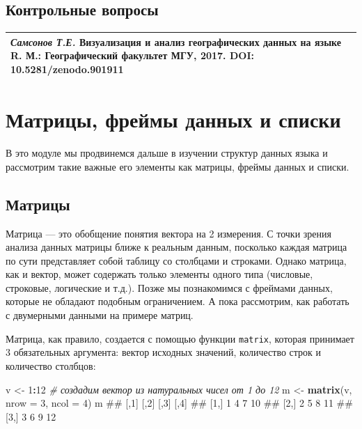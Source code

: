 \documentclass[]{book}
\newenvironment{Shaded}{\begin{snugshade}}{\end{snugshade}}
\newcommand{\KeywordTok}[1]{\textcolor[rgb]{0.13,0.29,0.53}{\textbf{#1}}}
\newcommand{\DataTypeTok}[1]{\textcolor[rgb]{0.13,0.29,0.53}{#1}}
\newcommand{\DecValTok}[1]{\textcolor[rgb]{0.00,0.00,0.81}{#1}}
\newcommand{\StringTok}[1]{\textcolor[rgb]{0.31,0.60,0.02}{#1}}
\newcommand{\CommentTok}[1]{\textcolor[rgb]{0.56,0.35,0.01}{\textit{#1}}}
\newcommand{\OperatorTok}[1]{\textcolor[rgb]{0.81,0.36,0.00}{\textbf{#1}}}
\newcommand{\NormalTok}[1]{#1}
\begin{document}
\section{Контрольные вопросы}\label{questions_vectors}

\begin{longtable}[]{@{}l@{}}
\toprule
\emph{Самсонов Т.Е.} \textbf{Визуализация и анализ географических данных
на языке R.} М.: Географический факультет МГУ, 2017. DOI:
10.5281/zenodo.901911\tabularnewline
\bottomrule
\end{longtable}

\chapter{Матрицы, фреймы данных и списки}\label{matrix_dataframes}

В это модуле мы продвинемся дальше в изучении структур данных языка и
рассмотрим такие важные его элементы как матрицы, фреймы данных и
списки.

\section{Матрицы}\label{matrices}

Матрица --- это обобщение понятия вектора на 2 измерения. С точки зрения
анализа данных матрицы ближе к реальным данным, посколько каждая матрица
по сути представляет собой таблицу со столбцами и строками. Однако
матрица, как и вектор, может содержать только элементы одного типа
(числовые, строковые, логические и т.д.). Позже мы познакомимся с
фреймами данных, которые не обладают подобным ограничением. А пока
рассмотрим, как работать с двумерными данными на примере матриц.

Матрица, как правило, создается с помощью функции \texttt{matrix},
которая принимает 3 обязательных аргумента: вектор исходных значений,
количество строк и количество столбцов:

\begin{Shaded}
\begin{Highlighting}[]
\NormalTok{v <-}\StringTok{ }\DecValTok{1}\OperatorTok{:}\DecValTok{12}  \CommentTok{# создадим вектор из натуральных чисел от 1 до 12}
\NormalTok{m <-}\StringTok{ }\KeywordTok{matrix}\NormalTok{(v, }\DataTypeTok{nrow =} \DecValTok{3}\NormalTok{, }\DataTypeTok{ncol =} \DecValTok{4}\NormalTok{)}
\NormalTok{m}
\NormalTok{##      [,1] [,2] [,3] [,4]}
\NormalTok{## [1,]    1    4    7   10}
\NormalTok{## [2,]    2    5    8   11}
\NormalTok{## [3,]    3    6    9   12}
\end{Highlighting}
\end{Shaded}
\end{document}
